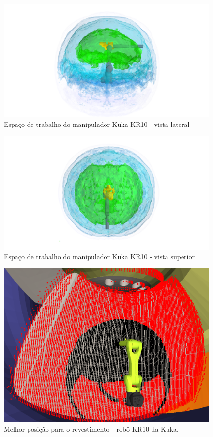\begin{figure}[h!]	
	\includegraphics[width=\columnwidth]{detail/figs/bighatch/kr10_front.png}
	\caption{Espaço de trabalho do manipulador Kuka KR10 - vista lateral}
	\label{fig::kr10cin1}
\end{figure}

\begin{figure}[h!]	
	\includegraphics[width=\columnwidth]{detail/figs/bighatch/kr10_top.png}
	\caption{Espaço de trabalho do manipulador Kuka KR10 - vista superior}
	\label{fig::kr10cin2}
\end{figure}

\begin{figure}[h!]	
	\includegraphics[width=\columnwidth]{detail/figs/bighatch/kr10_bestpos.png}
	\caption{Melhor posição para o revestimento - robô KR10 da Kuka.}
	\label{fig::kr10bestpos}
\end{figure}


